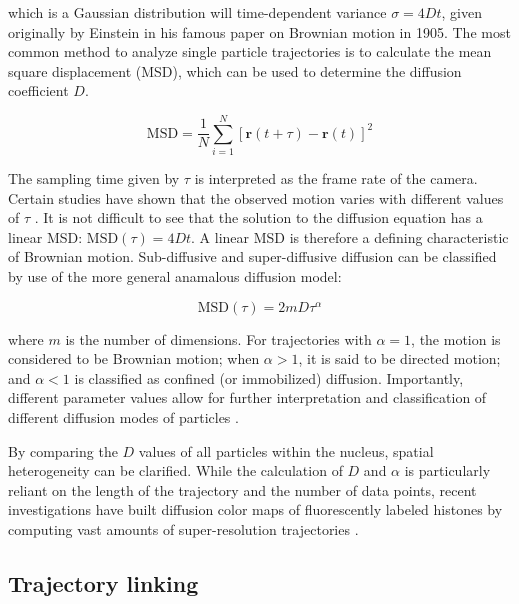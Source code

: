 which is a Gaussian distribution will time-dependent variance $\sigma=4Dt$, given originally by Einstein in his famous paper on Brownian motion in 1905. The most common method to analyze single particle trajectories is to calculate the mean square displacement (MSD), which can be used to determine the diffusion coefficient $D$.

\begin{equation}
\text{MSD} = \frac{1}{N} \sum_{i=1}^{N} \left[ \mathbf{r}(t + \tau) - \mathbf{r}(t) \right]^2
\end{equation}

The sampling time given by $\tau$ is interpreted as the frame rate of the camera. Certain studies have shown that the observed motion varies with different values of $\tau$ \parencite{Amitai2017,Shukron2017}. It is not difficult to see that the solution to the diffusion equation has a linear MSD: $\text{MSD}(\tau) = 4Dt$. A linear MSD is therefore a defining characteristic of Brownian motion. Sub-diffusive and super-diffusive diffusion can be classified by use of the more general anamalous diffusion model:

\begin{equation}
\text{MSD}(\tau) = 2mD\tau^\alpha
\end{equation}

where $m$ is the number of dimensions. For trajectories with $\alpha = 1$, the motion is considered to be Brownian motion; when $\alpha > 1$, it is said to be directed motion; and $\alpha < 1$ is classified as confined (or immobilized) diffusion. Importantly, different parameter values allow for further interpretation and classification of different diffusion modes of particles \parencite{Wasim2018,Zhong2020}.

By comparing the $D$ values of all particles within the nucleus, spatial heterogeneity can be clarified. While the calculation of $D$ and $\alpha$ is particularly reliant on the length of the trajectory and the number of data points, recent investigations have built diffusion color maps of fluorescently labeled histones by computing vast amounts of super-resolution trajectories \parencite{Amitai2017,Barth2020,Nozaki2017}.

\subsection{Trajectory linking}

